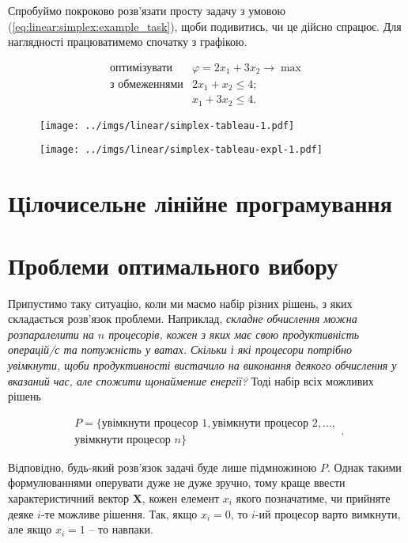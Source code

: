 \documentclass[\main/book.tex]{subfiles}
\begin{document}
Спробуймо покроково розв'язати просту задачу з умовою (\ref{eq:linear:simplex:example_task}), щоби подивитись, чи це дійсно спрацює. Для наглядності працюватимемо спочатку з графікою.

\begin{equation}
 \begin{array}{rl}
  \text{оптимізувати}  & \varphi = 2 x_1 + 3 x_2 \rightarrow \max \\
  \text{з обмеженнями} & 2 x_1 +   x_2 \leq 4; \\
                       &   x_1 + 3 x_2 \leq 4.
 \end{array}
 \label{eq:linear:simplex:example_task}
\end{equation}

\begin{figure}
 \centering
 \texttt{[image: ../imgs/linear/simplex-tableau-1.pdf]}
\end{figure}

\begin{figure}
 \centering
 \texttt{[image: ../imgs/linear/simplex-tableau-expl-1.pdf]}
\end{figure}
\section{Цілочисельне лінійне програмування}
\label{section:linear:integer}

\section{Проблеми оптимального вибору}
\label{section:linear:x_in_0-1}

Припустимо таку ситуацію, коли ми маємо набір різних рішень, з яких складається розв'язок проблеми. Наприклад, \textit{складне обчислення можна розпаралелити на $n$ процесорів, кожен з яких має свою продуктивність операцій/с та потужність у ватах. Скільки і які процесори потрібно увімкнути, щоби продуктивності вистачило на виконання деякого обчислення у вказаний час, але спожити щонайменше енергії?} Тоді набір всіх можливих рішень

\[
\begin{split}
P = \{
 \text{увімкнути процесор 1},
 \text{увімкнути процесор 2},
 \ldots, \\
 \text{увімкнути процесор $n$}
\}
\end{split}
.
\]

Відповідно, будь-який розв'язок задачі буде лише підмножиною $P$. Однак такими формулюваннями оперувати дуже не дуже зручно, тому краще ввести характеристичний вектор $\mathbf{X}$, кожен елемент $x_i$ якого позначатиме, чи прийняте деяке $i$-те можливе рішення. Так, якщо $x_i=0$, то $i$-ий процесор варто вимкнути, але якщо $x_i=1$ -- то навпаки.
\end{document}
